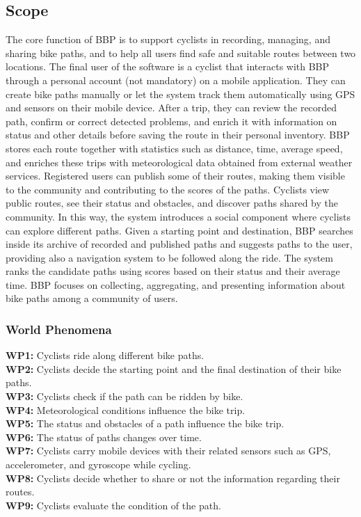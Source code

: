 \subsection{Scope}
The core function of BBP is to support cyclists in recording, managing, and sharing bike paths, and to help all users find safe and suitable routes between two locations. The final user of the software is a cyclist that interacts with BBP through a personal account (not mandatory) on a mobile application. They can create bike paths manually or let the system track them automatically using GPS and  sensors on their mobile device. After a trip, they can review the recorded path, confirm or correct detected problems, and enrich it with information on status and other details before saving the route in their personal inventory. BBP stores each route together with statistics such as distance, time, average speed, and enriches these trips with meteorological data obtained from external weather services. Registered users can publish some of their routes, making them visible to the community and contributing to the scores of the paths. Cyclists view public routes, see their status and obstacles, and discover paths shared by the community. In this way, the system introduces a social component where cyclists can explore different paths. Given a starting point and destination, BBP searches inside its archive of recorded and published paths and suggests paths to the user, providing also a navigation system to be followed along the ride. The system ranks the candidate paths using scores based on their status and their average time. BBP focuses on collecting, aggregating, and presenting information about bike paths among a community of users.
\subsubsection{World Phenomena}
\textbf{WP1:} Cyclists ride along different bike paths. \\
\textbf{WP2:} Cyclists decide the starting point and the final destination of their bike paths. \\
\textbf{WP3:} Cyclists check if the path can be ridden by bike. \\
\textbf{WP4:} Meteorological conditions influence the bike trip. \\
\textbf{WP5:} The status and obstacles of a path influence the bike trip. \\
\textbf{WP6:} The status of paths changes over time. \\
\textbf{WP7:} Cyclists carry mobile devices with their related sensors such as GPS, accelerometer, and gyroscope while cycling.  \\
\textbf{WP8:} Cyclists decide whether to share or not the information regarding their routes. \\
\textbf{WP9:} Cyclists evaluate the condition of the path.

